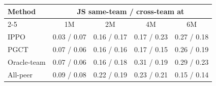 \begin{tabular}{lcccc}
\toprule
Method & \multicolumn{4}{c}{JS same-team / cross-team at} \\
\cmidrule(lr){2-5}
 & 1M & 2M & 4M & 6M \\
\midrule
IPPO & 0.03 / 0.07 & 0.16 / 0.17 & 0.17 / 0.23 & 0.27 / 0.18 \\
PGCT & 0.07 / 0.06 & 0.16 / 0.16 & 0.17 / 0.15 & 0.26 / 0.19 \\
Oracle-team & 0.07 / 0.06 & 0.16 / 0.18 & 0.31 / 0.19 & 0.29 / 0.23 \\
All-peer & 0.09 / 0.08 & 0.22 / 0.19 & 0.23 / 0.21 & 0.15 / 0.14 \\
\bottomrule
\end{tabular}
